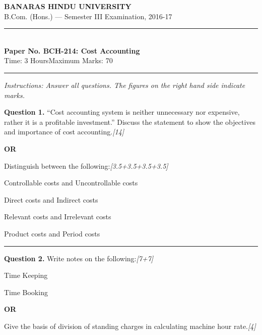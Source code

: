 \documentclass[11pt,a4paper]{article}
\newcommand{\pts}[1]{\hfill   \textit{[#1]}}
\begin{document}
\begin{center}
  {\large\bfseries BANARAS HINDU UNIVERSITY}\\[2pt]
  {\normalsize B.Com. (Hons.) --- Semester III Examination, 2016-17}\\[6pt]
  \rule{0.8\linewidth}{0.5pt}\\[6pt]
  {\large\bfseries Paper No. BCH-214: Cost Accounting}\\[4pt]
  {\normalsize Time: 3 Hours\hfill Maximum Marks: 70}
\end{center}

\rule{\linewidth}{0.4pt}

\smallskip



\noindent   \textit{Instructions: Answer all questions. The figures on the right hand side indicate marks.}

\bigskip




\noindent   \textbf{Question 1.}
``Cost accounting system is neither unnecessary nor expensive, rather it is a profitable investment.'' Discuss the statement to show the objectives and importance of cost accounting.\pts{14}

\centerline{   \textbf{OR}}

Distinguish between the following:\pts{3.5+3.5+3.5+3.5}

\begin{parts}
  \item Controllable costs and Uncontrollable costs
  \item Direct costs and Indirect costs
  \item Relevant costs and Irrelevant costs
  \item Product costs and Period costs
\end{parts}

\medskip\rule{\linewidth}{0.2pt}




\noindent   \textbf{Question 2.}
Write notes on the following:\pts{7+7}

\begin{parts}
  \item Time Keeping
  \item Time Booking
\end{parts}

\centerline{   \textbf{OR}}

Give the basis of division of standing charges in calculating machine hour rate.\pts{4}
\end{document}
